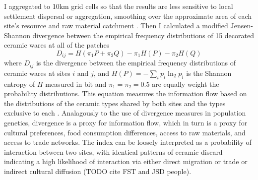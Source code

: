 \documentclass[10pt]{iopart}
\begin{document}
I aggregated to 10km grid cells so that the results are less sensitive to local settlement dispersal or aggregation, smoothing over the approximate area of each site's resource and raw material catchment \parencite{varien1999}. Then I calculated a modified Jensen-Shannon divergence between the empirical frequency distributions of 15 decorated ceramic wares at all of the patches
\begin{equation}
    D_{ij} = H\left(\pi_1P + \pi_2Q\right) - \pi_1H(P) - \pi_2H(Q)
\end{equation}
where $D_{ij}$ is the divergence between the empirical frequency distributions of ceramic wares at sites $i$ and $j$, and $H(P) = -\sum_i p_i \ln_2 p_i$ is the Shannon entropy of $H$ measured in bit and $\pi_1 = \pi_2 = 0.5$ are equally weight the probability distributions. This equation measures the information flow based on the distributions of the ceramic types shared by both sites and the types exclusive to each \parencite{Masucci2011,PaoloMasucci2012}. Analagously to the use of divergence measures in population genetics, divergence is a proxy for information flow, which in turn is a proxy for cultural preferences, food consumption differences, access to raw materials, and access to trade networks. The index can be loosely interpreted as a probability of interaction between two sites, with identical patterns of ceramic discard indicating a high likelihood of interaction via either direct migration or trade or indirect cultural diffusion (TODO cite FST and JSD people).
\end{document}
